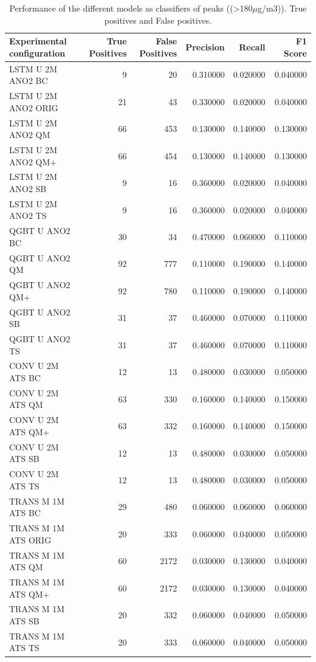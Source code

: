 \documentclass[12pt,a4paper]{book}
\begin{document}
\begin{table}[h]
\centering
\begin{tabular}{lrrrrr}
\toprule
 Experimental configuration & True Positives & False Positives & Precision & Recall & F1 Score \\
\midrule
LSTM U 2M ANO2 BC & 9 & 20 & 0.310000 & 0.020000 & 0.040000 \\
LSTM U 2M ANO2 ORIG & 21 & 43 & 0.330000 & 0.020000 & 0.040000 \\
LSTM U 2M ANO2 QM & 66 & 453 & 0.130000 & 0.140000 & 0.130000 \\
LSTM U 2M ANO2 QM+ & 66 & 454 & 0.130000 & 0.140000 & 0.130000 \\
LSTM U 2M ANO2 SB & 9 & 16 & 0.360000 & 0.020000 & 0.040000 \\
LSTM U 2M ANO2 TS & 9 & 16 & 0.360000 & 0.020000 & 0.040000 \\
QGBT U ANO2 BC & 30 & 34 & 0.470000 & 0.060000 & 0.110000 \\
QGBT U ANO2 QM & 92 & 777 & 0.110000 & 0.190000 & 0.140000 \\
QGBT U ANO2 QM+ & 92 & 780 & 0.110000 & 0.190000 & 0.140000 \\
QGBT U ANO2 SB & 31 & 37 & 0.460000 & 0.070000 & 0.110000 \\
QGBT U ANO2 TS & 31 & 37 & 0.460000 & 0.070000 & 0.110000 \\
CONV U 2M ATS BC & 12 & 13 & 0.480000 & 0.030000 & 0.050000 \\
CONV U 2M ATS QM & 63 & 330 & 0.160000 & 0.140000 & 0.150000 \\
CONV U 2M ATS QM+ & 63 & 332 & 0.160000 & 0.140000 & 0.150000 \\
CONV U 2M ATS SB & 12 & 13 & 0.480000 & 0.030000 & 0.050000 \\
CONV U 2M ATS TS & 12 & 13 & 0.480000 & 0.030000 & 0.050000 \\
TRANS M 1M ATS BC & 29 & 480 & 0.060000 & 0.060000 & 0.060000 \\
TRANS M 1M ATS ORIG & 20 & 333 & 0.060000 & 0.040000 & 0.050000 \\
TRANS M 1M ATS QM & 60 & 2172 & 0.030000 & 0.130000 & 0.040000 \\
TRANS M 1M ATS QM+ & 60 & 2172 & 0.030000 & 0.130000 & 0.040000 \\
TRANS M 1M ATS SB & 20 & 332 & 0.060000 & 0.040000 & 0.050000 \\
TRANS M 1M ATS TS & 20 & 333 & 0.060000 & 0.040000 & 0.050000 \\
\bottomrule
\end{tabular}

\caption{Performance of the different models as classifiers of peaks ((>180$\mu$g/m3)). True positives and False positives.  }
\label{tab:exp3_classif}
\end{table}
\end{document}
